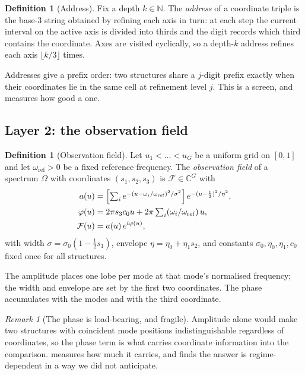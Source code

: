 \documentclass[11pt,twocolumn,a4paper]{article}
\theoremstyle{upthm}
\theoremstyle{definition}
\newtheorem{definition}[theorem]{Definition}
\theoremstyle{remark}
\newtheorem{remark}[theorem]{Remark}
\newcommand{\C}{\mathbb{C}}
\newcommand{\N}{\mathbb{N}}
\newcommand{\Field}{\mathcal{F}}
\newcommand{\wref}{\omega_{\mathrm{ref}}}
\begin{document}
\begin{definition}[Address]
\label{def:address}
Fix a depth $k\in\N$. The \emph{address} of a coordinate triple is the
base-3 string obtained by refining each axis in turn: at each step the
current interval on the active axis is divided into thirds and the digit
records which third contains the coordinate. Axes are visited cyclically,
so a depth-$k$ address refines each axis $\lfloor k/3\rfloor$ times.
\end{definition}

Addresses give a prefix order: two structures share a $j$-digit prefix
exactly when their coordinates lie in the same cell at refinement level
$j$. This is a screen, and  measures how good a one.

\subsection{Layer 2: the observation field}

\begin{definition}[Observation field]
\label{def:field}
Let $u_1<\dots<u_G$ be a uniform grid on $[0,1]$ and let $\wref>0$ be a
fixed reference frequency. The \emph{observation field} of a spectrum
$\Omega$ with coordinates $(s_1,s_2,s_3)$ is
$\Field\in\C^G$ with
\begin{align}
a(u) &= \Bigl[\textstyle\sum_{i}
   e^{-(u-\omega_i/\wref)^2/\sigma^2}\Bigr]\,
   e^{-(u-\frac12)^2/\eta^2},\label{eq:amp}\\
\varphi(u) &= 2\pi s_3 c_0 u
   + 2\pi\textstyle\sum_i (\omega_i/\wref)\,u,\label{eq:phase}\\
\Field(u) &= a(u)\,e^{i\varphi(u)},\label{eq:field}
\end{align}
with width $\sigma=\sigma_0(1-\tfrac12 s_1)$, envelope
$\eta=\eta_0+\eta_1 s_2$, and constants
$\sigma_0,\eta_0,\eta_1,c_0$ fixed once for all structures.
\end{definition}

The amplitude places one lobe per mode at that mode's normalised
frequency; the width and envelope are set by the first two coordinates.
The phase accumulates with the modes and with the third coordinate.

\begin{remark}[The phase is load-bearing, and fragile]
\label{rem:phaseload}
Amplitude alone would make two structures with coincident mode positions
indistinguishable regardless of coordinates, so the phase term is what
carries coordinate information into the comparison.
 measures how much it carries, and finds the answer is
regime-dependent in a way we did not anticipate.
\end{remark}
\end{document}
